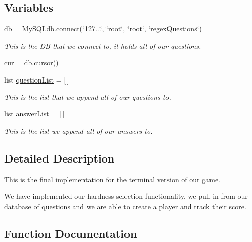 \subsection*{Variables}
\begin{DoxyCompactItemize}
\item 
\hyperlink{namespaceFinalImplementation_af4b43e181e5f0130a722add3a95a106b}{db} = My\+S\+Q\+Ldb.\+connect(\char`\"{}127...\char`\"{}, \char`\"{}root\char`\"{}, \char`\"{}root\char`\"{}, \char`\"{}regex\+Questions\char`\"{})
\begin{DoxyCompactList}\small\item\em This is the DB that we connect to, it holds all of our questions. \end{DoxyCompactList}\item 
\hyperlink{namespaceFinalImplementation_ab2b4f562e62481705272b729fddd627d}{cur} = db.\+cursor()
\item 
list \hyperlink{namespaceFinalImplementation_ab67267722fb7f86dae8a04110e61ee73}{question\+List} = \mbox{[}$\,$\mbox{]}
\begin{DoxyCompactList}\small\item\em This is the list that we append all of our questions to. \end{DoxyCompactList}\item 
list \hyperlink{namespaceFinalImplementation_a449b8b5f378a8f6fd17e7b6047c4f3a0}{answer\+List} = \mbox{[}$\,$\mbox{]}
\begin{DoxyCompactList}\small\item\em This is the list we append all of our answers to. \end{DoxyCompactList}\end{DoxyCompactItemize}


\subsection{Detailed Description}
This is the final implementation for the terminal version of our game. 

We have implemented our \textquotesingle{}hardness-\/selection\textquotesingle{} functionality, we pull in from our database of questions and we are able to create a player and track their score. 

\subsection{Function Documentation}
